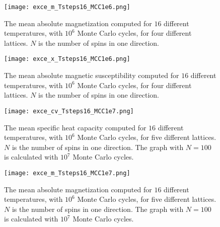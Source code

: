 \documentclass[12pt]{article}
\begin{document}
\begin{flushleft}
\begin{figure}[!h]
\begin{center}
\texttt{[image: exce\_m\_Tsteps16\_MCC1e6.png]}
\caption{\label{fig:m_1e6}The mean absolute magnetization computed for $16$ different temperatures, with $10^6$ Monte Carlo cycles, for four different lattices. $N$ is the number of spins in one direction.}
\end{center}
\end{figure}
\newpage
\begin{figure}[!h]
\begin{center}
\texttt{[image: exce\_x\_Tsteps16\_MCC1e6.png]}
\caption{\label{fig:x_1e6}The mean absolute magnetic susceptibility computed for $16$ different temperatures, with $10^6$ Monte Carlo cycles, for four different lattices. $N$ is the number of spins in one direction.}
\end{center}
\end{figure}

\begin{figure}[!h]
\begin{center}
\texttt{[image: exce\_cv\_Tsteps16\_MCC1e7.png]}
\caption{\label{fig:cv_1e7}The mean specific heat capacity computed for $16$ different temperatures, with $10^6$ Monte Carlo cycles, for five different lattices. $N$ is the number of spins in one direction. The graph with $N=100$ is calculated with $10^7$ Monte Carlo cycles.}
\end{center}
\end{figure}
\newpage
\begin{figure}[!h]
\begin{center}
\texttt{[image: exce\_m\_Tsteps16\_MCC1e7.png]}
\caption{\label{fig:m_1e7}The mean absolute magnetization computed for $16$ different temperatures, with $10^6$ Monte Carlo cycles, for five different lattices. $N$ is the number of spins in one direction. The graph with $N=100$ is calculated with $10^7$ Monte Carlo cycles.}
\end{center}
\end{figure}


\end{flushleft}
\end{document}
